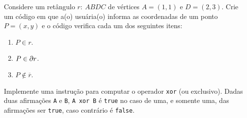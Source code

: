 \documentclass[12pt]{article}
\begin{document}
\begin{exr}
  Considere um retângulo $r: ~ABDC$ de vértices $A = (1, 1)$ e $D = (2, 3)$. Crie um código em que a(o) usuária(o) informa as coordenadas de um ponto $P = (x, y)$ e o código verifica cada um dos seguintes itens:
  \begin{enumerate}
  \item $P\in r$.
  \item $P\in \partial r$.
  \item $P\not\in \overline{r}$.
  \end{enumerate}
\end{exr}

\begin{exr}
  Implemente uma instrução para computar o operador \lstinline+xor+ (ou exclusivo). Dadas duas afirmações \lstinline+A+ e \lstinline+B+, \lstinline+A xor B+ é \lstinline+true+ no caso de uma, e somente uma, das afirmações ser \lstinline+true+, caso contrário é \lstinline+false+.
\end{exr}




\end{document}
